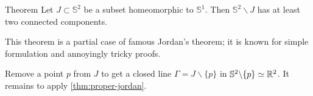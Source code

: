 \begin{thm}{Theorem}
Let $J\subset\mathbb{S}^2$ be a subset homeomorphic to $\mathbb{S}^1$.
Then $\mathbb{S}^2\backslash J$ has at least two connected components. 
\end{thm}

This theorem is a partial case of famous Jordan's theorem;
it is known for simple formulation and annoyingly tricky proofs.

Remove a point $p$ from $J$ to get a closed line $\Gamma=J\backslash\{p\}$ in $ \mathbb{S}^2\backslash\{p\}\simeq\mathbb{R}^2$.
It remains to apply \ref{thm:proper-jordan}.
\qeds
